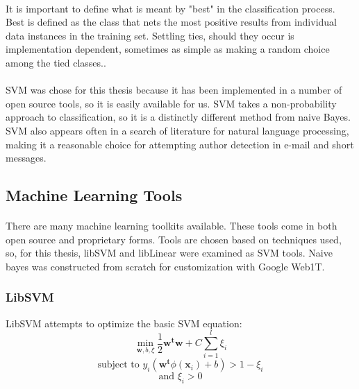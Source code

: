 			\paragraph{} It is important to define what is meant by "best" in the classification process.  Best is defined as the class that nets the most positive results from individual data instances in the training set. Settling ties, should they occur is implementation dependent, sometimes as simple as making a random choice among the tied classes.\cite{_multiclass_????}.
			
			\paragraph{} SVM was chose for this thesis because it has been implemented in a number of open source tools, so it is easily available for us.  SVM takes a non-probability approach to classification, so it is a distinctly different method from naive Bayes.  SVM also appears often in a search of literature for natural language processing, making it a reasonable choice for attempting author detection in e-mail and short messages.

	\subsection {Machine Learning Tools}
	\paragraph{} There are many machine learning toolkits available.  These tools come in both open source and proprietary forms.  Tools are chosen based on techniques used, so, for this thesis, libSVM and libLinear were examined as SVM tools.  Naive bayes was constructed from scratch for customization with Google Web1T.

		\subsubsection{LibSVM} LibSVM attempts to optimize the basic SVM equation:
		\begin{equation} \min_{\mathbf{w}, b, \xi} \frac{1}{2} \mathbf{w^t w} + C \sum_{i=1}^{l} \xi_i \end{equation}
		\begin{equation} \text{subject to } y_i( \mathbf{w^t}\phi ( \mathbf{x}_i ) + b ) > 1- \xi_i \end{equation}
		\begin{equation} \text{and } \xi_i > 0\end{equation}

